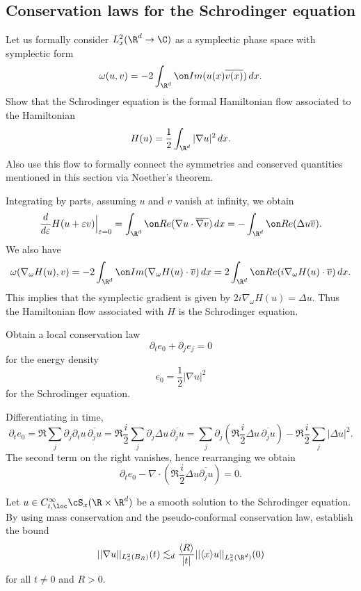 \subsection{Conservation laws for the Schrodinger equation}

\begin{statement}
	Let us formally consider $L^2_x (\R^d \to \C)$ as a symplectic phase space with symplectic form 
		\[ \omega(u, v) = - 2 \int_{\R^d} \Im (u(x) \overline{v(x)}) \, dx .\]
	Show that the Schrodinger equation is the formal Hamiltonian flow associated to the Hamiltonian
		\[ H(u) = \frac12 \int_{\R^d} |\nabla u|^2 \, dx. \]
	Also use this flow to formally connect the symmetries and conserved quantities mentioned in this section via Noether's theorem. 		
\end{statement}

\begin{solution}
	Integrating by parts, assuming $u$ and $v$ vanish at infinity, we obtain
		\[ \frac{d}{d\epsilon} H(u + \epsilon v) \Big|_{\epsilon = 0} = \int_{\R^d} \Re (\nabla u \cdot \overline{\nabla v}) \, dx = - \int_{\R^d} \Re (\Delta u \overline{v}). \]
	We also have
		\[ \omega(\nabla_\omega H(u), v) = - 2 \int_{\R^d} \Im (\nabla_\omega H(u) \cdot \overline{v}) \, dx = 2 \int_{\R^d} \Re (i \nabla_\omega H(u) \cdot \overline v)\, dx. \]
	This implies that the symplectic gradient is given by $2i \nabla_\omega H(u) = \Delta u$. Thus the Hamiltonian flow associated with $H$ is the Schrodinger equation. 
\end{solution}

\begin{statement}
	Obtain a local conservation law 
		\[ \partial_t e_0 + \partial_j e_j = 0 \]
	for the energy density
		\[e_0 = \frac12 |\nabla u|^2 \]
	for the Schrodinger equation. 	
\end{statement}

\begin{solution}
	Differentiating in time, 
		\[ \partial_t e_0 = \Re \sum_j \partial_j \partial_t u \, \overline{\partial_j u} = \Re \frac{i}{2} \sum_j \partial_j \Delta u \, \overline{\partial_j u} = \sum_j \partial_j \left( \Re \frac{i}{2} \Delta u \, \overline{\partial_j u}  \right) - \Re \frac{i}{2} \sum_j |\Delta u|^2.  \]
	The second term on the right vanishes, hence rearranging we obtain
		\[ \partial_t e_0 - \nabla \cdot \left(\Re \frac{i}{2} \Delta u \overline{\partial_j u} \right) = 0. \]	
\end{solution}

\begin{statement}
	Let $u \in C^\infty_{t, \loc} \cS_x (\R \times \R^d)$ be a smooth solution to the Schrodinger equation. By using mass conservation and the pseudo-conformal conservation law, establish the bound
		\[ ||\nabla u||_{L^2_x (B_R)} (t) \lesssim_d \frac{\langle R \rangle}{|t|} ||\langle x \rangle u||_{L^2_x (\R^d)} (0) \]
	for all $t \neq 0$ and $R > 0$. 	
\end{statement}

